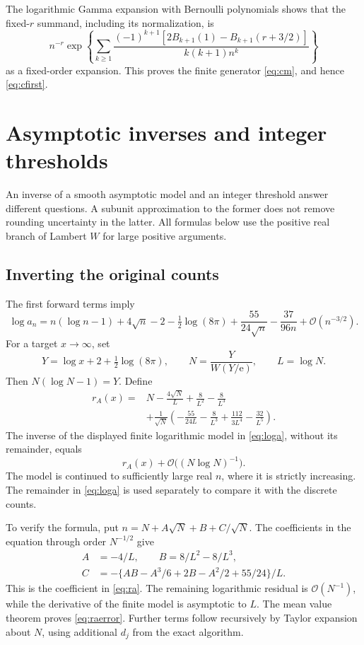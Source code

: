 \documentclass[11pt,letterpaper]{article}
\numberwithin{equation}{section}
\theoremstyle{remark}\newtheorem{remark}[theorem]{Remark}
\newcommand{\e}{\mathrm e}
\newcommand{\Ord}{\mathcal O}
\begin{document}
The logarithmic Gamma expansion with Bernoulli polynomials \cite{dlmfstirling} shows that the fixed-$r$ summand, including its normalization, is
\[
 n^{-r}\exp\!\left\{\sum_{k\ge1}
 \frac{(-1)^{k+1}[2B_{k+1}(1)-B_{k+1}(r+3/2)]}{k(k+1)n^k}\right\}
\]
as a fixed-order expansion. This proves the finite generator \eqref{eq:cm}, and hence \eqref{eq:cfirst}.

\section{Asymptotic inverses and integer thresholds}
An inverse of a smooth asymptotic model and an integer threshold answer different questions. A subunit approximation to the former does not remove rounding uncertainty in the latter. All formulas below use the positive real branch of Lambert $W$ for large positive arguments.

\subsection{Inverting the original counts}
The first forward terms imply
\begin{equation}\label{eq:loga}
 \log a_n=n(\log n-1)+4\sqrt n-2-\tfrac12\log(8\pi)
             +\frac{55}{24\sqrt n}-\frac{37}{96n}+\Ord(n^{-3/2}).
\end{equation}
For a target $x\to\infty$, set
\begin{equation}\label{eq:inverseN}
 Y=\log x+2+\tfrac12\log(8\pi),\qquad
 N=\frac{Y}{W(Y/\e)},\qquad L=\log N.
\end{equation}
Then $N(\log N-1)=Y$. Define
\begin{align}\label{eq:ra}
 r_A(x)={}&N-\frac{4\sqrt N}{L}+\frac8{L^2}-\frac8{L^3}\nonumber\\
 &+\frac1{\sqrt N}\left(-\frac{55}{24L}-\frac8{L^3}
                       +\frac{112}{3L^4}-\frac{32}{L^5}\right).
\end{align}
The inverse of the displayed finite logarithmic model in \eqref{eq:loga}, without its remainder, equals
\begin{equation}\label{eq:raerror}
 r_A(x)+\Ord\bigl((N\log N)^{-1}\bigr).
\end{equation}
The model is continued to sufficiently large real $n$, where it is strictly increasing. The remainder in \eqref{eq:loga} is used separately to compare it with the discrete counts.

To verify the formula, put $n=N+A\sqrt N+B+C/\sqrt N$. The coefficients in the equation through order $N^{-1/2}$ give
\begin{align*}
 A&=-4/L,\qquad B=8/L^2-8/L^3,\\
 C&=-\{AB-A^3/6+2B-A^2/2+55/24\}/L.
\end{align*}
This is the coefficient in \eqref{eq:ra}. The remaining logarithmic residual is $\Ord(N^{-1})$, while the derivative of the finite model is asymptotic to $L$. The mean value theorem proves \eqref{eq:raerror}. Further terms follow recursively by Taylor expansion about $N$, using additional $d_j$ from the exact algorithm.
\end{document}
